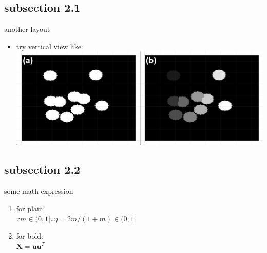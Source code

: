 \documentclass[11pt]{beamer}
\begin{document}
\subsection{subsection 2.1}
\begin{frame}[t]{another layout}
	\begin{minipage}[t]{1\textwidth}
        \vspace{0pt}
        \begin{itemize}
            \item {try vertical view like:}\\
            \singlespacing
            \centering
            \includegraphics[scale=0.5]{fig2.jpg}
        \end{itemize}
    \end{minipage}%
\end{frame}


\subsection{subsection 2.2}
\begin{frame}{some math expression}
	\begin{enumerate}
		\item for plain: \\ $\because m \in (0, 1] \therefore \eta = 2m/(1+m) \in (0, 1]$
		\item for bold: \\ $\boldsymbol{X} = \boldsymbol{uu}^T$
	\end{enumerate}
\end{frame}
\end{document}

